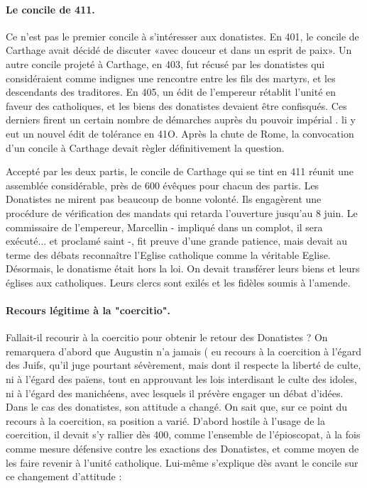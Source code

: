 \paragraph{Le concile de 411.} Ce n'est pas le premier concile à s'intéresser aux donatistes. En 401, le concile de Carthage avait décidé de discuter «avec douceur et dans un esprit de paix». Un autre concile projeté à Carthage, en 403, fut récusé par les donatistes qui considéraient comme indignes une rencontre entre les fils des martyrs, et les descendants des traditores. En 405, un édit de l'empereur rétablit l'unité en faveur des catholiques, et les biens des donatistes devaient être confisqués. Ces derniers firent un certain nombre de démarches auprès du pouvoir impérial . li y eut un nouvel édit de tolérance en 41O. Après la chute de Rome, la convocation d'un concile à Carthage devait règler définitivement la question.

Accepté par les deux partis, le concile de Carthage qui se tint en 411 réunit une assemblée considérable, près de 600 évêques pour chacun des partis. Les Donatistes ne mirent pas beaucoup de bonne volonté. Ils engagèrent une procédure de vérification des mandats qui retarda l'ouverture jusqu'au 8 juin. Le commissaire de l'empereur, Marcellin - impliqué dans un complot, il sera exécuté... et proclamé saint -, fit preuve d'une grande patience, mais devait au terme des débats reconnaître l'Eglise catholique comme la véritable Eglise. Désormais, le donatisme était hors la loi. On devait transférer leurs biens et leurs églises aux catholiques. Leurs clercs sont exilés et les fidèles soumis à l'amende.

\paragraph{Recours légitime	à  la "coercitio".} 	Fallait-il recourir à la coercitio
pour obtenir le retour des Donatistes ? On remarquera d'abord que Augustin n'a jamais	(
eu recours à la coercition à l'égard des Juifs, qu'il juge pourtant sévèrement, mais
dont il respecte la liberté de culte, ni à l'égard des païens, tout en approuvant les lois interdisant le culte des idoles, ni à l'égard des manichéens, avec lesquels il prévère engager un débat d'idées. Dans le cas des donatistes, son attitude a changé. On sait que, sur ce point du recours à la coercition, sa position a varié. D'abord hostile à l'usage de la coercition, il devait s'y rallier dès 400, comme l'ensemble de l'épioscopat, à la fois comme mesure défensive contre les exactions des Donatistes, et comme moyen de les faire revenir à l'unité catholique. Lui-même s'explique dès avant le concile sur ce changement d'attitude :


